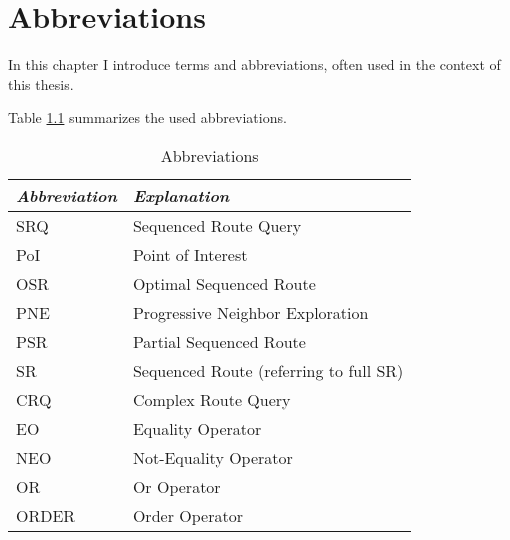 \chapter{Abbreviations}
In this chapter I introduce terms and abbreviations, often used in the context of this thesis.

Table \ref{abbr} summarizes the used abbreviations.

\begin{table}[h!]
	\centering
	\begin{tabular}{ |l|l| } 
		\hline
		\textit{Abbreviation} & \textit{Explanation} \\
		\hline
		SRQ & Sequenced Route Query \\ 

		PoI & Point of Interest \\ 

		OSR & Optimal Sequenced Route \\ 

		PNE & Progressive Neighbor Exploration \cite{OSR} \\ 

		PSR & Partial Sequenced Route \\ 

		SR & Sequenced Route (referring to full SR)\\
		
		CRQ & Complex Route Query \\
		
		EO & Equality Operator \\
		
		NEO & Not-Equality Operator \\
		
		OR & Or Operator \\
		
		ORDER & Order Operator \\
		\hline
	\end{tabular}
	\caption{Abbreviations}
	\label{abbr}
\end{table}